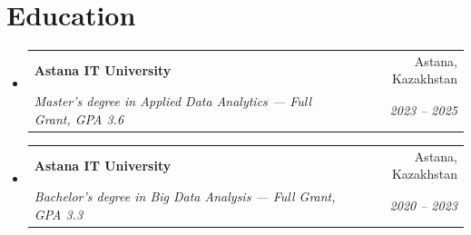 \documentclass[letterpaper,11pt]{article}
\makeatletter
\newcommand{\resumeItem}[1]{
  \item\small{
    {#1 \vspace{-2pt}}
  }
}
\newcommand{\resumeSubheading}[4]{
  \vspace{-2pt}\item
    \begin{tabular*}{0.97\textwidth}[t]{l@{\extracolsep{\fill}}r}
      \textbf{#1} & #2 \\
      \textit{\small#3} & \textit{\small #4} \\
    \end{tabular*}\vspace{-7pt}
}
\newcommand{\resumeSubHeadingListStart}{\begin{itemize}[leftmargin=0.15in, label={}]}
\newcommand{\resumeSubHeadingListEnd}{\end{itemize}}
\newcommand{\resumeItemListStart}{\begin{itemize}}
\newcommand{\resumeItemListEnd}{\end{itemize}\vspace{-5pt}}
\makeatother
\begin{document}
\section{Education}
  \resumeSubHeadingListStart
    \resumeSubheading
      {Astana IT University}{Astana, Kazakhstan}
      {Master's degree in Applied Data Analytics --- Full Grant, GPA 3.6}{2023 -- 2025}
    \resumeSubheading
      {Astana IT University}{Astana, Kazakhstan}
      {Bachelor's degree in Big Data Analysis --- Full Grant, GPA 3.3}{2020 -- 2023}
  \resumeSubHeadingListEnd




\end{document}
